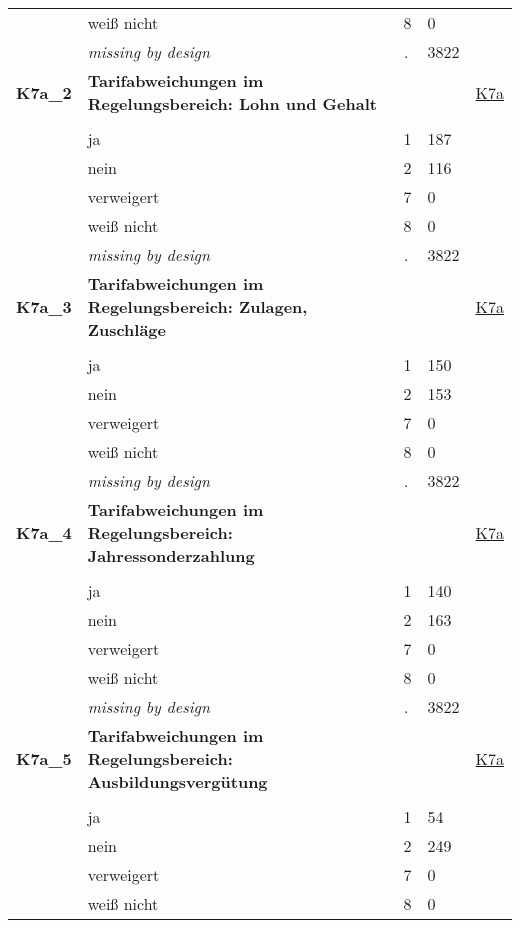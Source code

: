 \begin{longtable}{| L{2.65cm} | L{8cm} | C{1.5cm} | R{1.25cm} | C{2.25cm}  |}
   & weiß nicht & 8 & 0 &  \\ 
   & \textit{missing by design} & \textit{.} & 3822 &  \\ 
   \midrule
\textbf{K7a\_2}\label{var:K7a:2} & \textbf{Tarifabweichungen im Regelungsbereich: Lohn und Gehalt} &  &  & \hyperref[K7a]{K7a} \\ 
   &  &  &  &  \\ 
   & ja & 1 & 187 &  \\ 
   & nein & 2 & 116 &  \\ 
   & verweigert & 7 & 0 &  \\ 
   & weiß nicht & 8 & 0 &  \\ 
   & \textit{missing by design} & \textit{.} & 3822 &  \\ 
   \midrule
\textbf{K7a\_3}\label{var:K7a:3} & \textbf{Tarifabweichungen im Regelungsbereich: Zulagen, Zuschläge} &  &  & \hyperref[K7a]{K7a} \\ 
   &  &  &  &  \\ 
   & ja & 1 & 150 &  \\ 
   & nein & 2 & 153 &  \\ 
   & verweigert & 7 & 0 &  \\ 
   & weiß nicht & 8 & 0 &  \\ 
   & \textit{missing by design} & \textit{.} & 3822 &  \\ 
   \midrule
\textbf{K7a\_4}\label{var:K7a:4} & \textbf{Tarifabweichungen im Regelungsbereich: Jahressonderzahlung} &  &  & \hyperref[K7a]{K7a} \\ 
   &  &  &  &  \\ 
   & ja & 1 & 140 &  \\ 
   & nein & 2 & 163 &  \\ 
   & verweigert & 7 & 0 &  \\ 
   & weiß nicht & 8 & 0 &  \\ 
   & \textit{missing by design} & \textit{.} & 3822 &  \\ 
   \midrule
\textbf{K7a\_5}\label{var:K7a:5} & \textbf{Tarifabweichungen im Regelungsbereich: Ausbildungsvergütung} &  &  & \hyperref[K7a]{K7a} \\ 
   &  &  &  &  \\ 
   & ja & 1 & 54 &  \\ 
   & nein & 2 & 249 &  \\ 
   & verweigert & 7 & 0 &  \\ 
   & weiß nicht & 8 & 0 &  \\ 

\end{longtable}

